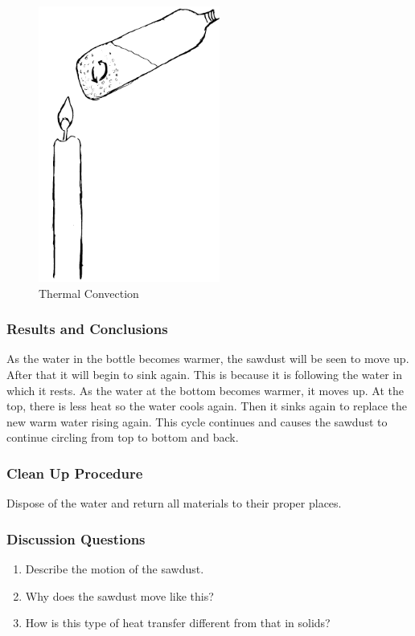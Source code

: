 \begin{figure}
\begin{center}
\includegraphics{./img/convection.png}
\caption{Thermal Convection}
\label{fig:convection}
\end{center}
\end{figure}

\subsubsection*{Results and Conclusions}
As the water in the bottle becomes warmer, the sawdust will be seen to move up.  After that it will begin to sink again.  This is because it is following the water in which it rests.  As the water at the bottom becomes warmer, it moves up.  At the top, there is less heat so the water cools again.  Then it sinks again to replace the new warm water rising again.  This cycle continues and causes the sawdust to continue circling from top to bottom and back.

\subsubsection*{Clean Up Procedure}
Dispose of the water and return all materials to their proper places.

\subsubsection*{Discussion Questions}
\begin{enumerate}
\item{Describe the motion of the sawdust.}
\item{Why does the sawdust move like this?}
\item{How is this type of heat transfer different from that in solids?}
\end{enumerate}

